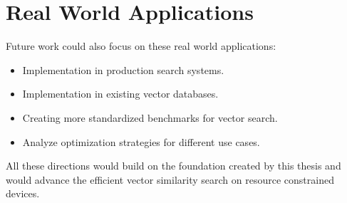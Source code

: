 \section{Real World Applications}
Future work could also focus on these real world applications:
\begin{itemize}
    \item Implementation in production search systems.
    \item Implementation in existing vector databases.
    \item Creating more standardized benchmarks for vector search.
    \item Analyze optimization strategies for different use cases.
\end{itemize}

\noindent All these directions would build on the foundation created by this thesis and would advance the efficient vector similarity search on resource constrained devices.